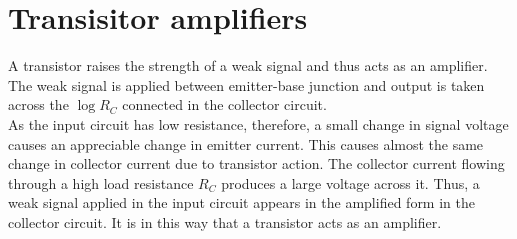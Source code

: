 \section{Transisitor amplifiers}
A transistor raises the strength of a weak signal and thus acts as an amplifier. The weak signal is applied between emitter-base junction and output is taken across the $\log R_{C}$ connected in the collector circuit. \\
As the input circuit has low resistance, therefore, a small change in signal voltage causes an appreciable change in emitter current. This causes almost the same change in collector current due to transistor action. The collector current flowing through a high load resistance $R_{C}$ produces a large voltage across it. Thus, a weak signal applied in the input circuit appears in the amplified form in the collector circuit. It is in this way that a transistor acts as an amplifier.
